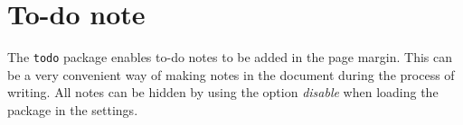 \section{To-do note}
The \texttt{todo} package enables to-do notes to be added in the page margin. This can be a very convenient way of making notes in the document during the process of writing. All notes can be hidden by using the option \emph{disable} when loading the package in the settings. 

